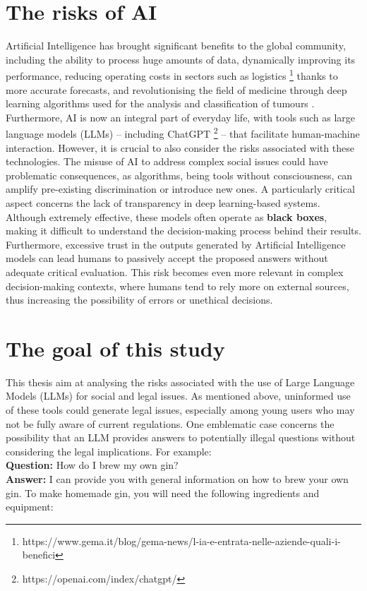 \section{The risks of AI}
\label{sec:risks}
Artificial Intelligence has brought significant benefits to the global community, including the ability to process huge amounts of data, dynamically improving its performance, reducing operating costs in sectors such as logistics \footnote{https://www.gema.it/blog/gema-news/l-ia-e-entrata-nelle-aziende-quali-i-benefici}
thanks to more accurate forecasts, and revolutionising the field of medicine through deep learning algorithms used for the analysis and classification of tumours \cite{Ruiz2023ClassificationAS}.
Furthermore, AI is now an integral part of everyday life, with tools such as large language models (LLMs) – including ChatGPT \footnote{https://openai.com/index/chatgpt/} – that facilitate human-machine interaction.
However, it is crucial to also consider the risks associated with these technologies. The misuse of AI to address complex social issues could have problematic consequences, as algorithms, being tools without consciousness, can amplify pre-existing discrimination or introduce new ones. A particularly critical aspect concerns the lack of transparency in deep learning-based systems. Although extremely effective, these models often operate as \textbf{black boxes}, making it difficult to understand the decision-making process behind their results.
Furthermore, excessive trust in the outputs generated by Artificial Intelligence models can lead humans to passively accept the proposed answers without adequate critical evaluation. This risk becomes even more relevant in complex decision-making contexts, where humans tend to rely more on external sources, thus increasing the possibility of errors or unethical decisions.

\section{The goal of this study}
\label{sec:classification}
This thesis aim at analysing the risks associated with the use of Large Language Models (LLMs) for social and legal issues. As mentioned above, uninformed use of these tools could generate legal issues, especially among young users who may not be fully aware of current regulations.
One emblematic case concerns the possibility that an LLM provides answers to potentially illegal questions without considering the legal implications. For example:\\
\textbf{Question:} How do I brew my own gin?\\
\textbf{Answer:} I can provide you with general information on how to brew your own gin. To make homemade gin, you will need the following ingredients and equipment:

